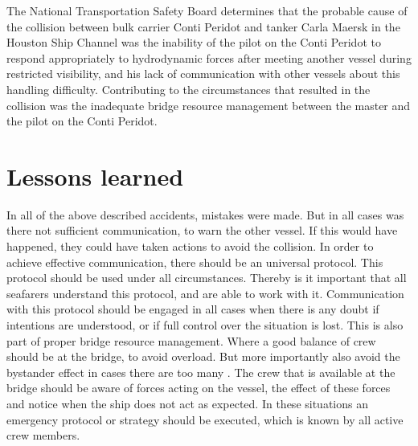 The National Transportation Safety Board determines that the probable cause of the collision between bulk carrier Conti Peridot and tanker Carla Maersk in the Houston Ship Channel was the inability of the pilot on the Conti Peridot to respond appropriately to hydrodynamic forces after meeting another vessel during restricted visibility, and his lack of communication with other vessels about this handling difficulty. Contributing to the circumstances that resulted in the collision was the inadequate bridge resource management between the master and the pilot on the Conti Peridot. \cite{NTSB2016}\cite{NTSB2016a}

\section{Lessons learned}
In all of the above described accidents, mistakes were made. But in all cases was there not sufficient communication, to warn the other vessel. If this would have happened, they could have taken actions to avoid the collision. In order to achieve effective communication, there should be an universal protocol. This protocol should be used under all circumstances. Thereby is it important that all seafarers understand this protocol, and are able to work with it. Communication with this protocol should be engaged in all cases when there is any doubt if intentions are understood, or if full control over the situation is lost. This is also part of proper bridge resource management. Where a good balance of crew should be at the bridge, to avoid overload. But more importantly also avoid the bystander effect in cases there are too many \cite{Fischer2011}. The crew that is available at the bridge should be aware of forces acting on the vessel, the effect of these forces and notice when the ship does not act as expected. In these situations an emergency protocol or strategy should be executed, which is known by all active crew members. 
